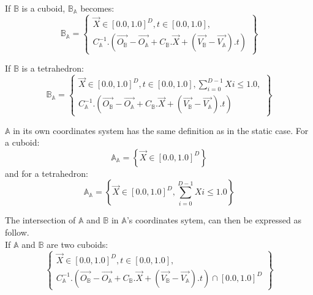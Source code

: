\documentclass[12pt, a4paper]{article}
\begin{document}
If $\mathbb{B}$ is a cuboid, $\mathbb{B}_\mathbb{A}$ becomes:
\begin{equation}
\mathbb{B}_\mathbb{A}=\left\lbrace
\begin{array}{c}
\overrightarrow{X}\in[0.0,1.0]^D,t\in[0.0,1.0],\\
C_\mathbb{A}^{-1}.\left(\overrightarrow{O_\mathbb{B}}-\overrightarrow{O_\mathbb{A}}+C_\mathbb{B}.\overrightarrow{X}+\left(\overrightarrow{V_\mathbb{B}}-\overrightarrow{V_\mathbb{A}}\right).t\right)
\end{array}
\right\rbrace
\end{equation}

If $\mathbb{B}$ is a tetrahedron:
\begin{equation}
\mathbb{B}_\mathbb{A}=\left\lbrace
\begin{array}{c}
\overrightarrow{X}\in[0.0,1.0]^D,t\in[0.0,1.0],\sum_{i=0}^{D-1}Xi\le1.0,\\
C_\mathbb{A}^{-1}.\left(\overrightarrow{O_\mathbb{B}}-\overrightarrow{O_\mathbb{A}}+C_\mathbb{B}.\overrightarrow{X}+\left(\overrightarrow{V_\mathbb{B}}-\overrightarrow{V_\mathbb{A}}\right).t\right)
\end{array}
\right\rbrace
\end{equation}

$\mathbb{A}$ in its own coordinates system has the same definition as in the static case. For a cuboid:
\begin{equation}
\mathbb{A}_\mathbb{A}=\left\lbrace\overrightarrow{X}\in[0.0,1.0]^D\right\rbrace
\end{equation}
and for a tetrahedron:
\begin{equation}
\mathbb{A}_\mathbb{A}=\left\lbrace\overrightarrow{X}\in[0.0,1.0]^D,\sum_{i=0}^{D-1}Xi\le1.0\right\rbrace
\end{equation}

The intersection of $\mathbb{A}$ and $\mathbb{B}$ in $\mathbb{A}$'s coordinates sytem, can then be expressed as follow.\\

If $\mathbb{A}$ and $\mathbb{B}$ are two cuboids:
\begin{equation}
\left\lbrace
\begin{array}{c}
\overrightarrow{X}\in[0.0,1.0]^D,t\in[0.0,1.0],\\
C_\mathbb{A}^{-1}.\left(\overrightarrow{O_\mathbb{B}}-\overrightarrow{O_\mathbb{A}}+C_\mathbb{B}.\overrightarrow{X}+\left(\overrightarrow{V_\mathbb{B}}-\overrightarrow{V_\mathbb{A}}\right).t\right)\cap[0.0,1.0]^D
\end{array}
\right\rbrace
\end{equation}
\end{document}
